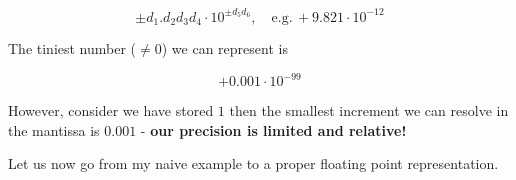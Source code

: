 \begin{equation}
    \pm d_1.d_2 d_3 d_4 \cdot 10^{\pm d_5 d_6}, \quad \text{e.g.} \, +9.821 \cdot 10^{-12}
\end{equation}


The tiniest number ($\neq 0$) we can represent is

\begin{equation}
    +0.001 \cdot 10^{-99}
\end{equation}

However, consider we have stored $1$ then the smallest increment 
we can resolve in the mantissa is $0.001$ - \textbf{our precision is limited and relative!}

Let us now go from my naive example to a proper floating point representation.

